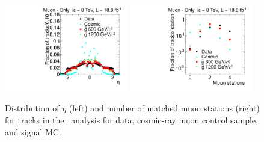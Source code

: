 \begin{figure}
\centering
  \includegraphics[clip=false, trim=0.0cm 0cm 0.0cm 0cm, width=0.48\textwidth]{figures/muonly/Selection_Comp_8TeV_Cosmic_Eta_BS}
  \includegraphics[clip=false, trim=0.0cm 0cm 0.0cm 0cm, width=0.48\textwidth]{figures/muonly/Selection_Comp_8TeV_Cosmic_MatchedStations_BS} \\
\caption[Distribution of $\eta$ and number of matched muon stations for data, cosmic-ray muon control sample, and signal MC in the \muononly\ analysis.]
{Distribution of $\eta$ (left) and number of matched muon stations (right) for tracks in the \muononly\ analysis
for data, cosmic-ray muon control sample, and signal MC.}
    \label{fig:MuOnlyPreselA}
\end{figure}


